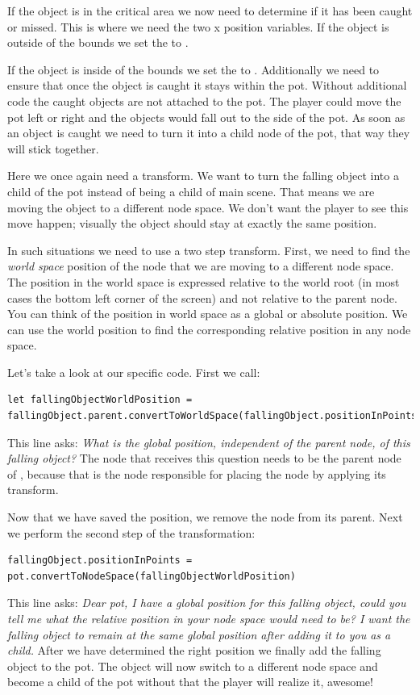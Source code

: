 If the object is in the critical area we now need to determine if it has
been caught or missed. This is where we need the two x position variables. If
the object is outside of the bounds we set the  to
.

If the object is inside of the bounds we set the  to
. Additionally we need to ensure that once the object is
caught it stays within the pot. Without additional code the caught objects are
not attached to the pot. The player could move the pot left or right and the
objects would fall out to the side of the pot. As soon as an object is caught we
need to turn it into a child node of the pot, that way they will stick together.

Here we once again need a transform. We
want to turn the falling object into a child of the pot instead of being a
child of main scene. That means we are moving the object to a different node
space. We don't want the player to see this move happen; visually the object
should stay at exactly the same position. 

In such situations we need to use a two step transform. First, we need to find
the \textit{world space} position of the node that we are moving to a
different node space. The position in the world space is expressed relative to
the world root (in most cases the bottom left corner of the screen) and not
relative to the parent node. You can think of the position in world space as a
global or absolute position. We can use the world position to find the
corresponding relative position in any node space.

Let's take a look at our specific code. First we call:
\begin{lstlisting}
let fallingObjectWorldPosition = fallingObject.parent.convertToWorldSpace(fallingObject.positionInPoints)
\end{lstlisting}
This line asks: \textit{What is the global position, independent of the parent
node, of this falling object?} The node that receives this question needs to be
the parent node of , because that is the node
responsible for placing the  node by applying its
transform.

Now that we have saved the position, we remove the node from its parent. Next we
perform the second step of the transformation:
\begin{lstlisting}
fallingObject.positionInPoints = pot.convertToNodeSpace(fallingObjectWorldPosition)
\end{lstlisting}
This line asks: \textit{Dear pot, I have a global position for this falling
object, could you tell me what the relative position in your node space would
need to be? I want the falling object to remain at the same global position after adding it to
you as a child.}
After we have determined the right position we finally add the falling object to
the pot. The object will now switch to a different node space and become a child
of the pot without that the player will realize it, awesome!

